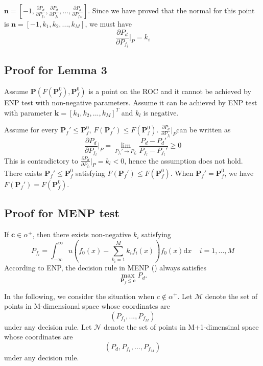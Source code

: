 \documentclass[12pt,journal,a4paper,twoside,onecolumn]{IEEEtran}
\newcommand{\rmnum}[1]{\romannumeral #1}
\begin{document}
\begin{spacing}{2.5}
 $\mathbf{n} = [-1, \frac{\partial P_d}{\partial P_{f_1}}, \frac{\partial P_d}{\partial P_{f_2}}, ..., \frac{\partial P_d}{\partial P_{f_M}}]$. Since we have proved that  the normal for this point is $\mathbf{n} = [-1, k_1, k_2, ..., k_M]$, we must have
\begin{equation}
\frac{\partial P_d}{\partial P_{f_i}}\bigg|_{P} = k_i
\end{equation}


\subsection{Proof for Lemma 3}
Assume $\mathbf{P} (F(\mathbf{P}_{f}^0), \mathbf{P}_{f}^0)$ is a point on the ROC and it cannot be achieved by ENP test with non-negative parameters. Assume it can be achieved by ENP test with parameter $\mathbf{k} = [k_1, k_2, ..., k_M]^T$ and $k_l$ is negative.

Assume for every $\mathbf{P}_{f}' \leq \mathbf{P}_{f}^0$, $F(\mathbf{P}_f') \leq F(\mathbf{P}_f^0)$. $\frac{\partial P_d}{\partial P_{f_l}}|_P$can be written as
\[
\frac{\partial P_d}{\partial P_{f_l}}|_P = \lim_{P_{f_l}' \rightarrow P_{f_l}}\frac{P_d - P_d'}{P_{f_l} - P_{f_l}'} \geq 0
\]
This is contradictory to $\frac{\partial P_d}{\partial P_{f_l}}|_P = k_l <0$, hence the assumption does not hold. There exists $\mathbf{P}_{f}' \leq \mathbf{P}_{f}^0$ satisfying $F(\mathbf{P}_f') \leq F(\mathbf{P}_f^0)$. When $\mathbf{P}_f' = \mathbf{P}_f^0$, we have $F(\mathbf{P}_f') = F(\mathbf{P}_f^0)$.

\subsection{Proof for MENP test}

If $\mathbf{c} \in \alpha^+$, then there exists non-negative $k_i$ satisfying
\[
P_{f_i} = \int_{-\infty}^{\infty} u(f_0(x) - \sum_{k_i=1}^{M}k_if_i(x))f_0(x)\mathrm{d}x \;\;\;\;i=1, ..., M
\]
According to ENP, the decision rule in MENP (\rmnum{1}) always satisfies 
\[
\max_{\mathbf{P}_f \leq \mathbf{c}} P_d.
\]

In the following, we consider the situation when $c \notin \alpha^+$. Let $\mathcal{M}$ denote the set of points in M-dimensional space whose coordinates are 
\[
(P_{f_1}, ..., P_{f_M})
\]
under any decision rule. Let $\mathcal{N}$ denote the set of points in M+1-dimensinal space whose coordinates are 
\[
(P_d, P_{f_1}, ..., P_{f_M})
\]
under any decision rule.


\end{spacing}
\end{document}

